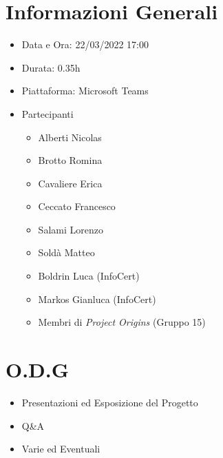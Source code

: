 \documentclass[a4paper, 12pt]{article}
\begin{document}
\makefrontpage
\section*{Informazioni Generali}
\begin{itemize}
    \item Data e Ora: 22/03/2022 17:00
    \item Durata: 0.35h
    \item Piattaforma: Microsoft Teams
    \item Partecipanti
    \begin{itemize}
        \item Alberti Nicolas
        \item Brotto Romina
        \item Cavaliere Erica
        \item Ceccato Francesco
        \item Salami Lorenzo
        \item Soldà Matteo
        \item Boldrin Luca (InfoCert)
        \item Markos Gianluca (InfoCert)
        \item Membri di \textit{Project Origins} (Gruppo 15) 
    \end{itemize}
\end{itemize}
\section*{O.D.G}
\begin{itemize}
    \item Presentazioni ed Esposizione del Progetto
    \item Q\&A
    \item Varie ed Eventuali
\end{itemize}
\end{document}
